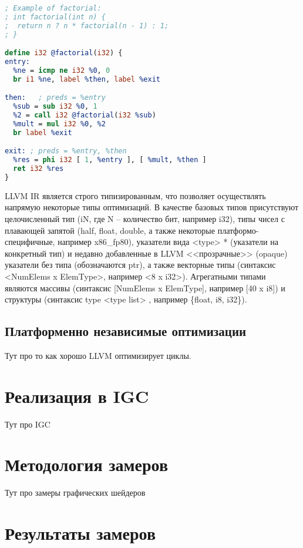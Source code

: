 \bigskip

\begin{lstlisting}[language=llvm, caption=Пример LLVM IR]
; Example of factorial:
; int factorial(int n) {
;  return n ? n * factorial(n - 1) : 1;
; }

define i32 @factorial(i32) {
entry:
  %ne = icmp ne i32 %0, 0
  br i1 %ne, label %then, label %exit

then:   ; preds = %entry
  %sub = sub i32 %0, 1
  %2 = call i32 @factorial(i32 %sub)
  %mult = mul i32 %0, %2
  br label %exit

exit: ; preds = %entry, %then
  %res = phi i32 [ 1, %entry ], [ %mult, %then ]
  ret i32 %res
}
\end{lstlisting}

LLVM IR является строго типизированным, что позволяет осуществлять напрямую некоторые типы оптимизаций. В качестве базовых типов присутствуют целочисленный тип (iN, где N -- количество бит, например i32), типы чисел с плавающей запятой (half, float, double, а также некоторые платформо-специфичные, например x86\_fp80), указатели вида <type> * (указатели на конкретный тип) и недавно добавленные в LLVM <<прозрачные>> (opaque) указатели без типа (обозначаются ptr), а также векторные типы (синтаксис <NumElems x ElemType>, например <8 x i32>). Агрегатными типами являются массивы (синтаксис [NumElems x ElemType], например [40 x i8]) и структуры (синтаксис type { <type list> }, например \{float, i8, i32\}).

\subsection{Платформенно независимые оптимизации}\label{subsec:results/llvm/opts}

Тут про то как хорошо LLVM оптимизирует циклы.

\section{Реализация в IGC}\label{sec:results/igc}

Тут про IGC

\section{Методология замеров}\label{sec:results/measures}

Тут про замеры графических шейдеров

\section{Результаты замеров}\label{sec:results/results}

